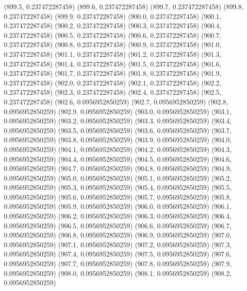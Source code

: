 {					(899.5, 0.237472287458)
					(899.6, 0.237472287458)
					(899.7, 0.237472287458)
					(899.8, 0.237472287458)
					(899.9, 0.237472287458)
					(900.0, 0.237472287458)
					(900.1, 0.237472287458)
					(900.2, 0.237472287458)
					(900.3, 0.237472287458)
					(900.4, 0.237472287458)
					(900.5, 0.237472287458)
					(900.6, 0.237472287458)
					(900.7, 0.237472287458)
					(900.8, 0.237472287458)
					(900.9, 0.237472287458)
					(901.0, 0.237472287458)
					(901.1, 0.237472287458)
					(901.2, 0.237472287458)
					(901.3, 0.237472287458)
					(901.4, 0.237472287458)
					(901.5, 0.237472287458)
					(901.6, 0.237472287458)
					(901.7, 0.237472287458)
					(901.8, 0.237472287458)
					(901.9, 0.237472287458)
					(902.0, 0.237472287458)
					(902.1, 0.237472287458)
					(902.2, 0.237472287458)
					(902.3, 0.237472287458)
					(902.4, 0.237472287458)
					(902.5, 0.237472287458)
					(902.6, 0.0956952850259)
					(902.7, 0.0956952850259)
					(902.8, 0.0956952850259)
					(902.9, 0.0956952850259)
					(903.0, 0.0956952850259)
					(903.1, 0.0956952850259)
					(903.2, 0.0956952850259)
					(903.3, 0.0956952850259)
					(903.4, 0.0956952850259)
					(903.5, 0.0956952850259)
					(903.6, 0.0956952850259)
					(903.7, 0.0956952850259)
					(903.8, 0.0956952850259)
					(903.9, 0.0956952850259)
					(904.0, 0.0956952850259)
					(904.1, 0.0956952850259)
					(904.2, 0.0956952850259)
					(904.3, 0.0956952850259)
					(904.4, 0.0956952850259)
					(904.5, 0.0956952850259)
					(904.6, 0.0956952850259)
					(904.7, 0.0956952850259)
					(904.8, 0.0956952850259)
					(904.9, 0.0956952850259)
					(905.0, 0.0956952850259)
					(905.1, 0.0956952850259)
					(905.2, 0.0956952850259)
					(905.3, 0.0956952850259)
					(905.4, 0.0956952850259)
					(905.5, 0.0956952850259)
					(905.6, 0.0956952850259)
					(905.7, 0.0956952850259)
					(905.8, 0.0956952850259)
					(905.9, 0.0956952850259)
					(906.0, 0.0956952850259)
					(906.1, 0.0956952850259)
					(906.2, 0.0956952850259)
					(906.3, 0.0956952850259)
					(906.4, 0.0956952850259)
					(906.5, 0.0956952850259)
					(906.6, 0.0956952850259)
					(906.7, 0.0956952850259)
					(906.8, 0.0956952850259)
					(906.9, 0.0956952850259)
					(907.0, 0.0956952850259)
					(907.1, 0.0956952850259)
					(907.2, 0.0956952850259)
					(907.3, 0.0956952850259)
					(907.4, 0.0956952850259)
					(907.5, 0.0956952850259)
					(907.6, 0.0956952850259)
					(907.7, 0.0956952850259)
					(907.8, 0.0956952850259)
					(907.9, 0.0956952850259)
					(908.0, 0.0956952850259)
					(908.1, 0.0956952850259)
					(908.2, 0.0956952850259)
}
